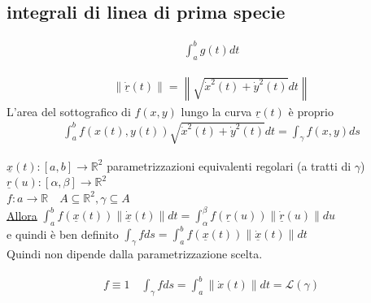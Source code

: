 \documentclass[a4paper, oneside]{article}
\begin{document}
\subsection{integrali di linea di prima specie}
\begin{gather*}
    \int_{a}^{b} g(t) dt
\end{gather*}
\begin{center}
\end{center}
\begin{gather*}
     \left\lVert \underline{\dot{r}}(t) \right\rVert  =\left\lVert \sqrt{\dot{x}^2(t) + \dot{y}^2(t)} dt\right\rVert 
\end{gather*}
L'area del sottografico di $f(x,y)$ lungo la curva $\underline{r}(t)$ è proprio
\begin{gather*}
    \int_{a}^{b} f(x(t),y(t)) \sqrt{\dot{x}^2(t) + \dot{y}^2(t)} dt = \int_{\gamma} f(x,y) ds 
\end{gather*}
\begin{theorem}
    $\underline{x}(t):[a,b] \to \mathbb{R}^2$ parametrizzazioni equivalenti regolari (a tratti di $\gamma$)\\
    $\underline{r}(u):[\alpha,\beta] \to \mathbb{R}^2$\\
    $f:a \to \mathbb{R} \quad A \subseteq \mathbb{R}^2, \gamma \subseteq A$\\
    \underline{Allora} $\int_{a}^{b} f(\underline{x}(t))\left\lVert \underline{\dot{x}} (t)\right\rVert dt = \int_{\alpha}^{\beta} f(\underline{r}(u)) \left\lVert \underline{\dot{r}}(u) \right\rVert du$\\
    e quindi è ben definito $\int_{\gamma} f ds = \int_{a}^{b} f(\underline{x}(t)) \left\lVert \underline{\dot{x}}(t)\right\rVert dt$\\
    Quindi non dipende dalla parametrizzazione scelta. 
\end{theorem}
\begin{observation}
    \begin{gather*}
        f \equiv 1 \quad \int_{\gamma} f ds = \int_{a}^{b} \left\lVert \dot{x}(t) \right\rVert dt = \mathcal{L}(\gamma)
    \end{gather*}
\end{observation}
\end{document}
